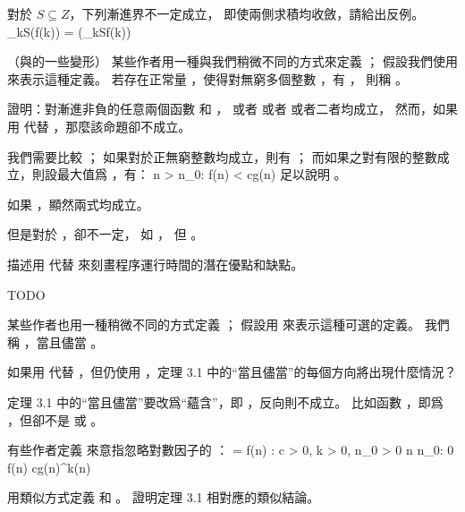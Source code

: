 \startitem
對於 $S\subseteq Z$，下列漸進界不一定成立，
即使兩側求積均收斂，請給出反例。
\startformula
\prod_{k\in S}\Theta(f(k)) = \Theta(\prod_{k\in S}f(k))
\stopformula

\startANSWER
{}
\stopANSWER
\stopitem

\stopigBase
\stopPROBLEM

\startPROBLEM
（與\m{\Omega}的一些變形）
某些作者用一種與我們稍微不同的方式來定義 \m{\Omega}；
假設我們使用 \m{\mathop{\Omega}\limits^{\infty}} 來表示這種定義。
若存在正常量 ，使得對無窮多個整數 ，有 ，
則稱 。
\startigBase[a]
\item 證明：對漸進非負的任意兩個函數  和 ，
或者  或者  或者二者均成立，
然而，如果用 \m{\Omega} 代替 \m{\mathop{\Omega}\limits^{\infty}}，那麼該命題卻不成立。

\startANSWER
我們需要比較 ；
如果對於正無窮整數均成立，則有 \m{\mathop{\Omega}\limits^{\infty}}；
而如果之對有限的整數成立，則設最大值爲 ，有：
\startformula
\forall n > n_0: f(n) < cg(n)
\stopformula
足以說明 。

如果 ，顯然兩式均成立。

但是對於 \m{\Omega}，卻不一定，
如 ，
但 。
\stopANSWER

\item 描述用 \m{\mathop{\Omega}\limits^{\infty}} 代替 \m{\Omega} 來刻畫程序運行時間的潛在優點和缺點。

\startANSWER
TODO
\stopANSWER

\stopigBase

某些作者也用一種稍微不同的方式定義 ；
假設用  來表示這種可選的定義。
我們稱 ，當且儘當 。

\startigBase[a,continue]
\item 如果用  代替 ，但仍使用 \m{\Omega}，定理 3.1 中的“當且儘當”的每個方向將出現什麼情況？

\startANSWER
定理 3.1 中的“當且儘當”要改爲“蘊含”，即 ，反向則不成立。
比如函數 ，即爲 ，但卻不是  或 。
\stopANSWER
\stopigBase

有些作者定義  來意指忽略對數因子的 ：
\startformula
{} = \lbrace f(n) : \exists c > 0, k > 0, n_0 > 0 \forall n \geq n_0: 0 \leq f(n) \leq cg(n)\lg^k(n) \rbrace
\stopformula
\startigBase[a,continue]
\item 用類似方式定義 \m{\tilde{\Omega}} 和 \m{\tilde{\Theta}}。
證明定理 3.1 相對應的類似結論。

